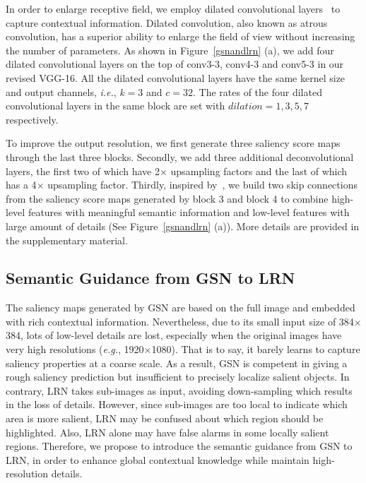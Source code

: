 \documentclass[10pt,twocolumn,letterpaper]{article}
\begin{document}
In order to enlarge receptive field, we employ dilated convolutional layers~\cite{yu2015multi} to capture contextual information. Dilated convolution, also known as atrous convolution, has a superior ability to enlarge the field of view without increasing the number of parameters. As shown in Figure~\ref{gsnandlrn} (a), we add four dilated convolutional layers on the top of conv3-3, conv4-3 and conv5-3 in our revised VGG-16. All the dilated convolutional layers have the same kernel size and output channels, \emph{i.e.}, $k=3$ and $c=32$. The rates of the four dilated convolutional layers in the same block are set with $dilation=1, 3, 5, 7$ respectively.

To improve the output resolution, we first generate three saliency score maps through the last three blocks. Secondly, we add three additional deconvolutional layers, the first two of which have 2{$\times$} upsampling factors and the last of which has a 4{$\times$} upsampling factor. Thirdly, inspired by~\cite{long2015fully}, we build two skip connections from the saliency score maps generated by block 3 and block 4 to combine high-level features with meaningful semantic information and low-level features with large amount of details (See Figure~\ref{gsnandlrn} (a)). More details are provided in the supplementary material.

\subsection{Semantic Guidance from GSN to LRN} \label{42}

The saliency maps generated by GSN are based on the full image and embedded with rich contextual information. Nevertheless, due to its small input size of 384{$\times$}384, lots of low-level details are lost, especially when the original images have very high resolutions (\emph{e.g.}, 1920{$\times$}1080). That is to say, it barely learns to capture saliency properties at a coarse scale. As a result, GSN is competent in giving a rough saliency prediction but insufficient to precisely localize salient objects. In contrary, LRN takes sub-images as input, avoiding down-sampling which results in the loss of details. However, since sub-images are too local to indicate which area is more salient, LRN may be confused about which region should be highlighted. Also, LRN alone may have false alarms in some locally salient regions. Therefore, we propose to introduce the semantic guidance from GSN to LRN, in order to enhance global contextual knowledge while maintain high-resolution details.
\end{document}
